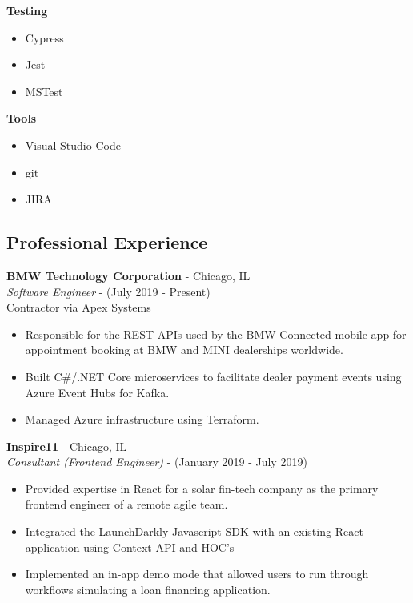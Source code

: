 \documentclass[12pt]{article}
\begin{document}
\begin{paracol}{2}
\noindent \textbf{Testing}
\begin{itemize}
    \setlength\itemsep{0em}
    \item {\footnotesize{Cypress}}
    \item {\footnotesize{Jest}}
    \item {\footnotesize{MSTest}}
\end{itemize}

\noindent \textbf{Tools}
\begin{itemize}
    \setlength\itemsep{0em}
    \item {\footnotesize{Visual Studio Code}}
    \item {\footnotesize{git}}
    \item {\footnotesize{JIRA}}
\end{itemize}

\switchcolumn 

\subsection*{Professional Experience} 

\textbf{BMW Technology Corporation} - Chicago, IL \\
\textit{Software Engineer} - {\footnotesize{(July 2019 - Present)}} \\
{\footnotesize{Contractor via Apex Systems}} 
\begin{itemize}[leftmargin=*]
    \setlength\itemsep{0em}
    \item{\footnotesize{Responsible for the REST APIs used by the BMW Connected mobile app for appointment booking at BMW and MINI dealerships worldwide.}}
    \item {\footnotesize{Built C\#/.NET Core microservices to facilitate dealer payment events using Azure Event Hubs for Kafka.}}
    \item {\footnotesize{Managed Azure infrastructure using Terraform.}}
\end{itemize} 


\noindent \textbf{Inspire11} - Chicago, IL \\
\textit{Consultant (Frontend Engineer)} - {\footnotesize{(January 2019 - July 2019)}} 
\begin{itemize}[leftmargin=*]
    \setlength\itemsep{0em}
    \item{\footnotesize{Provided expertise in React for a solar fin-tech company as the primary frontend engineer of a remote agile team.}}
    \item {\footnotesize{Integrated the LaunchDarkly Javascript SDK with an existing React application using Context API and HOC's}}
    \item {\footnotesize{Implemented an in-app demo mode that allowed users to run through workflows simulating a loan financing application.}}
\end{itemize} 


\end{paracol}
\end{document}
